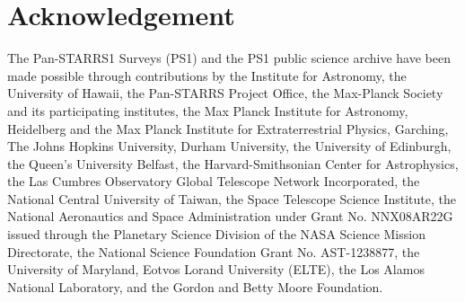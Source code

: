 \documentclass[]{spieman}
\begin{document}
\section{Acknowledgement}
The Pan-STARRS1 Surveys (PS1) and the PS1 public science archive have been made possible through
contributions by the Institute for Astronomy, the University of Hawaii, the Pan-STARRS Project
Office, the Max-Planck Society and its participating institutes, the Max Planck Institute for
Astronomy, Heidelberg and the Max Planck Institute for Extraterrestrial Physics, Garching, The Johns
Hopkins University, Durham University, the University of Edinburgh, the Queen's University Belfast,
the Harvard-Smithsonian Center for Astrophysics, the Las Cumbres Observatory Global Telescope
Network Incorporated, the National Central University of Taiwan, the Space Telescope Science
Institute, the National Aeronautics and Space Administration under Grant No. NNX08AR22G issued
through the Planetary Science Division of the NASA Science Mission Directorate, the National Science
Foundation Grant No. AST-1238877, the University of Maryland, Eotvos Lorand University (ELTE), the
Los Alamos National Laboratory, and the Gordon and Betty Moore Foundation.




\end{document}
